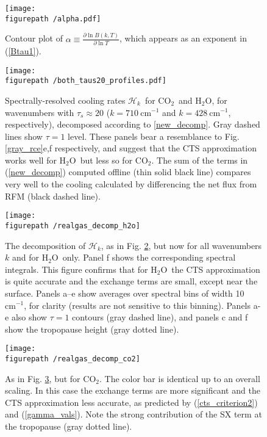 \documentclass{ametsoc}
\newcommand{\eqnref}[1]{(\ref{#1})}
\newcommand{\cminverse}{\ensuremath{\mathrm{cm^{-1}}}}
\newcommand{\partialder}[2]{\ensuremath{\frac{\partial #1}{\partial #2}}}
\newcommand{\cotwo}{\ensuremath{\mathrm{CO_2}}}
\newcommand{\htwo}{\ensuremath{\mathrm{H_2O}}}
\newcommand{\ch}{\ensuremath{\mathcal{H}}}
\newcommand{\chk}{\ensuremath{\ch_k}}
\newcommand{\taus}{\ensuremath{\tau_s}}
\newcommand{\figurepath}{../plots/}
\begin{document}
\begin{figure}[h]
	\begin{center}
			\texttt{[image: \\figurepath /alpha.pdf]}
		\caption{Contour plot of $\alpha \equiv \partialder{\ln B(k,T)}{\ln T}$, which appears as an exponent in \eqnref{Btau1}.  
		\label{alpha}
		}
	\end{center}
\end{figure}

\begin{figure}[h]
	\begin{center}
			\texttt{[image: \\figurepath /both\_taus20\_profiles.pdf]}
		\caption{Spectrally-resolved cooling rates \chk\ for \cotwo\  and \htwo, for  wavenumbers with $\taus\approx20$ ($k=710\ \cminverse$ and $k=428\ \cminverse$, respectively), decomposed according to  \eqref{new_decomp}. Gray dashed lines show $\tau=1$ level. These panels bear a resemblance to Fig. \ref{gray_rce}e,f respectively, and suggest that the  CTS approximation works well for \htwo\ but less so for \cotwo. The sum of the terms in \eqnref{new_decomp} computed offline (thin solid black line) compares very well to the cooling calculated by differencing the net flux  from RFM (black dashed line).
		\label{both_taus20_profiles}
		}
	\end{center}
\end{figure}


\begin{figure}[h]
	\begin{center}
			\texttt{[image: \\figurepath /realgas\_decomp\_h2o]}
		\caption{ The decomposition of \chk, as in Fig. \ref{both_taus20_profiles}, but now for all wavenumbers $k$ and for \htwo\ only. Panel f shows the corresponding spectral integrals.  This figure confirms that for \htwo\ the CTS approximation is quite accurate and the exchange terms are small, except near the surface.  Panels a--e show averages over spectral bins of width 10 \cminverse, for clarity (results are not sensitive to this binning). Panels a-e also show $\tau=1$ contours (gray dashed line), and panels c and f show the tropopause height (gray dotted line).
		\label{realgas_decomp_h2o}
		}
	\end{center}
\end{figure}

\begin{figure}[h]
	\begin{center}
			\texttt{[image: \\figurepath /realgas\_decomp\_co2]}
		\caption{As in Fig. \ref{realgas_decomp_h2o}, but for \cotwo. The color bar is identical up to an overall scaling. In this case the exchange terms are more significant and the CTS approximation less accurate, as predicted by \eqnref{cts_criterion2} and \eqnref{gamma_vals}. Note the strong contribution of the SX term at the tropopause (gray dotted line). 
				\label{realgas_decomp_co2}
		}
	\end{center}
\end{figure}
\end{document}
